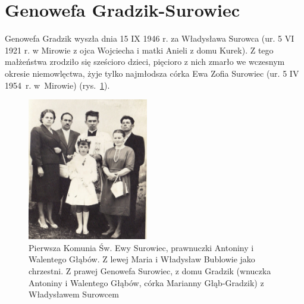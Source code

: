 \section{Genowefa Gradzik-Surowiec}
Genowefa Gradzik wyszła dnia 15 IX 1946 r. za Władysława Surowca (ur. 5 VI 1921 r. w Mirowie z ojca Wojciecha i matki Anieli z domu Kurek). Z tego małżeństwa zrodziło się sześcioro dzieci, pięcioro z nich zmarło we wczesnym okresie niemowlęctwa, żyje tylko najmłodsza córka Ewa Zofia Surowiec (ur. 5 IV 1954~r. w~Mirowie) (rys.~\ref{rys:ewa_skowronek_genowefa_i_wladyslaw_surowiec}).


\begin{figure}[!h]
\begin{center}
\includegraphics[width=0.47\textwidth]{zdjecia/ewa_skowronek_genowefa_i_wladyslaw_surowiec.jpg}
\caption[Pierwsza Komunia Św. Ewy Surowiec]{Pierwsza Komunia Św. Ewy Surowiec, prawnuczki Antoniny i Walentego Głąbów. Z lewej Maria i Władysław Bublowie jako chrzestni. Z prawej Genowefa Surowiec, z domu Gradzik (wnuczka Antoniny i Walentego Głąbów, córka Marianny Głąb-Gradzik) z Władysławem Surowcem}
\label{rys:ewa_skowronek_genowefa_i_wladyslaw_surowiec}
\end{center}
\end{figure}


